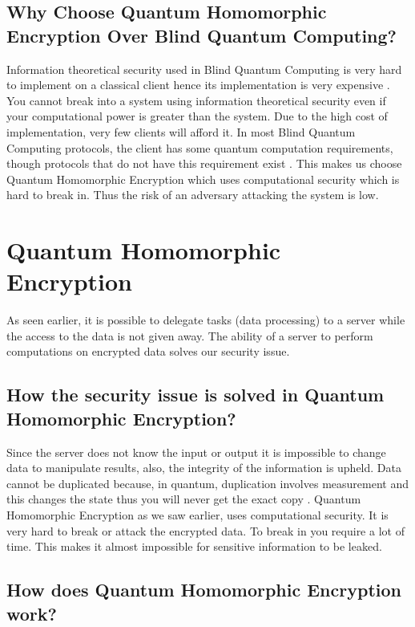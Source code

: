 \subsection{Why Choose Quantum Homomorphic Encryption Over Blind Quantum Computing?}

Information theoretical security used in Blind Quantum Computing is very hard to implement on a classical client hence its implementation is very expensive \citep{ouyang2015quantum}.  You cannot break into a system using information theoretical security even if your computational power is greater than the system. Due to the high cost  of implementation, very few clients will afford it. In most Blind Quantum Computing protocols, the client has some quantum computation requirements, though protocols that do not have this requirement exist \citep{broadbent2009universal}. This makes us choose Quantum Homomorphic Encryption which uses computational security which is hard to break in. Thus the risk of an adversary attacking the system is low.

\section{Quantum Homomorphic Encryption}
As seen earlier, it is possible to delegate tasks (data processing) to a server while the access to the data is not given away. The ability of a server to perform computations on encrypted data solves our security issue.  

\subsection{How the security issue is solved in Quantum Homomorphic Encryption?}


Since the server does not know the input or output it is impossible to change data to manipulate results, also, the integrity of the information is upheld. Data cannot be duplicated because, in quantum, duplication involves measurement and this changes the state thus you will never get the exact copy \citep{kassal2011simulating}. Quantum Homomorphic Encryption as we saw earlier, uses computational security. It is very hard to break or attack the encrypted data. To break in you require a lot of time. This makes it almost impossible for sensitive information to be leaked.


\subsection{How does Quantum Homomorphic Encryption work?}

